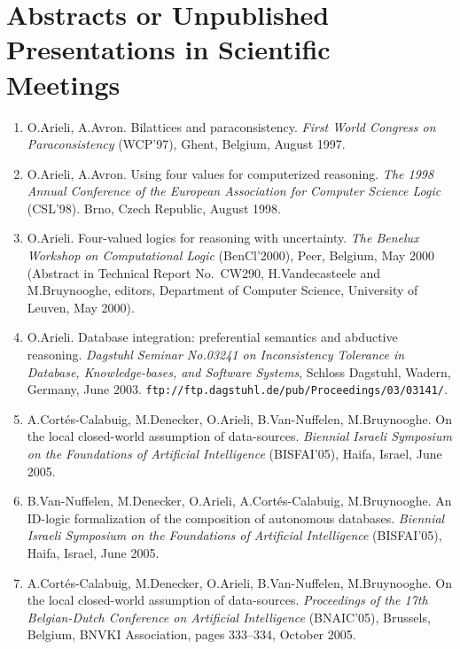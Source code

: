 \documentclass{article}
\begin{document}
\section*{Abstracts or Unpublished Presentations in Scientific Meetings}

\begin{enumerate}

    \item O.Arieli, A.Avron.
          Bilattices and paraconsistency. {\em First World Congress on
          Paraconsistency\/} (WCP'97), Ghent, Belgium, August 1997.

    \item O.Arieli, A.Avron.
          Using four values for computerized reasoning. {\em The 1998
          Annual Conference of the European Association for Computer
          Science Logic\/} (CSL'98). Brno, Czech Republic, August 1998.

    \item O.Arieli.
          Four-valued logics for reasoning with uncertainty. {\em The
          Benelux Workshop on Computational Logic\/} (BenCl'2000), Peer,
          Belgium, May 2000 (Abstract in Technical Report No.~CW290,
          H.Vandecasteele and M.Bruynooghe, editors, Department of
          Computer Science, University of Leuven, May 2000).

    \item O.Arieli.
          Database integration: preferential semantics and abductive
          reasoning. {\em Dagstuhl Seminar No.03241 on Inconsistency
          Tolerance in Database, Knowledge-bases, and Software Systems\/},
          Schloss Dagstuhl, Wadern, Germany, June 2003.
          {\tt ftp://ftp.dagstuhl.de/pub/Proceedings/03/03141/}.

   \item A.Cort\'es-Calabuig, M.Denecker, O.Arieli, B.Van-Nuffelen, M.Bruynooghe.
         On the local closed-world assumption of data-sources.
         {\em Biennial Israeli Symposium on the Foundations of Artificial
         Intelligence\/} (BISFAI'05), Haifa, Israel, June 2005.

   \item B.Van-Nuffelen, M.Denecker, O.Arieli, A.Cort\'es-Calabuig, M.Bruynooghe.
         An ID-logic formalization of the composition of autonomous databases.
         {\em Biennial Israeli Symposium on the Foundations of Artificial
         Intelligence\/} (BISFAI'05), Haifa, Israel, June 2005.

   \item A.Cort\'es-Calabuig, M.Denecker, O.Arieli, B.Van-Nuffelen, M.Bruynooghe.
         On the local closed-world assumption of data-sources.
         {\em Proceedings of the 17th Belgian-Dutch Conference on Artificial Intelligence\/}
         (BNAIC'05), Brussels, Belgium, BNVKI Association, pages 333--334,
         October 2005.


\end{enumerate}
\end{document}
